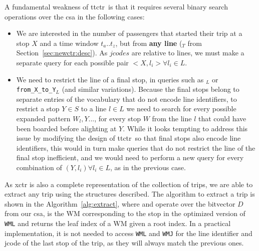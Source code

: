 	A fundamental weakness of \gls{ttctr}~is that it requires several binary search operations over the \gls{csa} in the following cases:
    \begin{itemize}
        \item We are interested in the number of passengers that started their trip at a stop $X$ and a time window $t_a..t_z$, but from \textbf{any line} (\texttt{\startX$_{T}$} from Section~\ref{sec:newctr:desc}). As $jcodes$ are relative to lines, we must make a separate query for each possible pair $<X, l_i> \forall l_i \in L$.
        \item We need to restrict the line of a final stop, in queries such as \texttt{\endX$_{L}$} or \texttt{from\_X\_to\_Y$_{L}$} (and similar variations). Because the final stops belong to separate entries of the vocabulary that do not encode line identifiers, to restrict a stop $Y\in S$ to a line $l\in L$ we need to search for every possible expanded pattern $W_l,Y...$, for every stop $W$ from the line $l$ that could have been boarded before alighting at $Y$. While it looks tempting to address this issue by modifying the design of \gls{ttctr}~so that final stops also encode line identifiers, this would in turn make queries that do not restrict the line of the final stop inefficient, and we would need to perform a new query for every combination of $(Y, l_i) \forall l_i \in L$, as in the previous case.
    \end{itemize}
	
	As \gls{xctr} is also a complete representation of the collection of trips, we are able to extract any trip using the structures described.  The algorithm to extract a trip is shown in the Algorithm~\ref{alg:extract}, where  and  operate over the bitvector $D$ from our \gls{csa},  is the WM corresponding to the stop  in the optimized version of \texttt{WML} and  returns the leaf index of a WM given a root index. In a practical implementation, it is not needed to access \texttt{WML} and \texttt{WMJ} for the line identifier and jcode of the last stop of the trip, as they will always match the previous ones.
	
